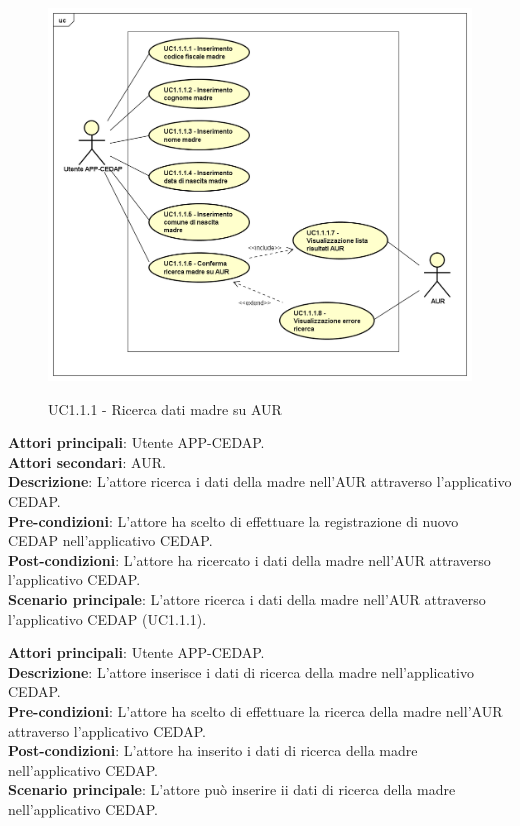 \documentclass[a4paper]{article}
\newcounter{subsubsubsection}[subsubsection]
\begin{document}
\begin{figure}[H]
	\centering
	\includegraphics[width=\linewidth]{uml/UC1_1_1.png}
    \label{fig:UC1.1.1}
	\caption{UC1.1.1 - Ricerca dati madre su AUR}
\end{figure}

\label{UC1.1.1}

\textbf{Attori principali}: Utente APP-CEDAP.
\\
\textbf{Attori secondari}: AUR.
\\
\textbf{Descrizione}: L'attore ricerca i dati della madre nell'AUR attraverso l'applicativo CEDAP.
\\
\textbf{Pre-condizioni}: L'attore ha scelto di effettuare la registrazione di nuovo CEDAP nell'applicativo CEDAP.
\\
\textbf{Post-condizioni}: L'attore ha ricercato i dati della madre nell'AUR attraverso l'applicativo CEDAP.
\\
\textbf{Scenario principale}: L'attore ricerca i dati della madre nell'AUR attraverso l'applicativo CEDAP (UC1.1.1).


\label{UC1.1.1.15}

\textbf{Attori principali}: Utente APP-CEDAP.
\\
\textbf{Descrizione}: L'attore inserisce i dati di ricerca della madre nell'applicativo CEDAP.
\\
\textbf{Pre-condizioni}: L'attore ha scelto di effettuare la ricerca della madre nell'AUR attraverso l'applicativo CEDAP.
\\
\textbf{Post-condizioni}: L'attore ha inserito i dati di ricerca della madre nell'applicativo CEDAP.
\\
\textbf{Scenario principale}: L'attore può inserire ii dati di ricerca della madre nell'applicativo CEDAP.
\end{document}
